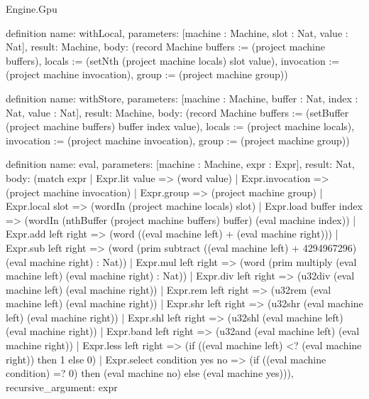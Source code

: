 \begin{lexlean}{Engine.Gpu}
\begin{semanticmodule}
definition{
  name: withLocal,
  parameters: [machine : Machine, slot : Nat, value : Nat],
  result: Machine,
  body: (record Machine {buffers := (project machine buffers), locals := (setNth (project machine locals) slot value), invocation := (project machine invocation), group := (project machine group)})
}

definition{
  name: withStore,
  parameters: [machine : Machine, buffer : Nat, index : Nat, value : Nat],
  result: Machine,
  body: (record Machine {buffers := (setBuffer (project machine buffers) buffer index value), locals := (project machine locals), invocation := (project machine invocation), group := (project machine group)})
}

definition{
  name: eval,
  parameters: [machine : Machine, expr : Expr],
  result: Nat,
  body: (match expr
    | Expr.lit value => (word value)
    | Expr.invocation => (project machine invocation)
    | Expr.group => (project machine group)
    | Expr.local slot => (wordIn (project machine locals) slot)
    | Expr.load buffer index => (wordIn (nthBuffer (project machine buffers) buffer) (eval machine index))
    | Expr.add left right => (word ((eval machine left) + (eval machine right)))
    | Expr.sub left right => (word (prim subtract ((eval machine left) + 4294967296) (eval machine right) : Nat))
    | Expr.mul left right => (word (prim multiply (eval machine left) (eval machine right) : Nat))
    | Expr.div left right => (u32div (eval machine left) (eval machine right))
    | Expr.rem left right => (u32rem (eval machine left) (eval machine right))
    | Expr.shr left right => (u32shr (eval machine left) (eval machine right))
    | Expr.shl left right => (u32shl (eval machine left) (eval machine right))
    | Expr.band left right => (u32and (eval machine left) (eval machine right))
    | Expr.less left right => (if ((eval machine left) <? (eval machine right)) then 1 else 0)
    | Expr.select condition yes no => (if ((eval machine condition) =? 0) then (eval machine no) else (eval machine yes))),
  recursive_argument: expr
}


\end{semanticmodule}
\end{lexlean}
